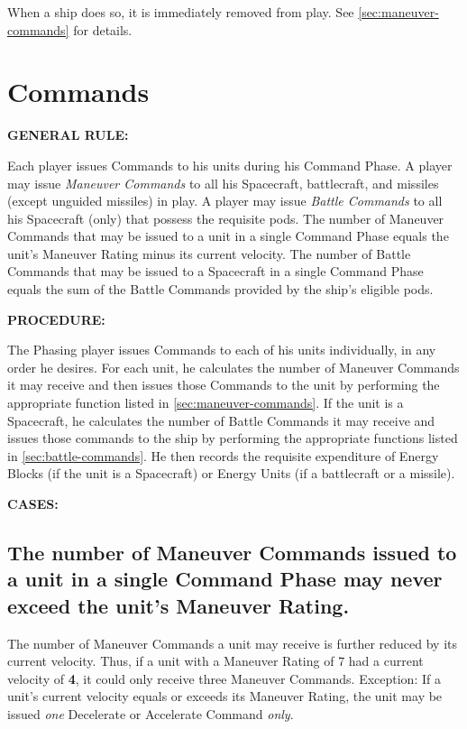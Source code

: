 When a ship does so, it is immediately removed from play. See
\ref{sec:maneuver-commands} for details.

\section{Commands}
\label{sec:commands}

\noindent\textbf{GENERAL RULE:}

Each player issues Commands to his units during his Command Phase. A
player may issue \emph{Maneuver Commands} to all his Spacecraft,
battlecraft, and missiles (except unguided missiles) in play. A player
may issue \emph{Battle Commands} to all his Spacecraft (only) that
possess the requisite pods. The number of Maneuver Commands that may
be issued to a unit in a single Command Phase equals the unit's
Maneuver Rating minus its current velocity. The number of Battle
Commands that may be issued to a Spacecraft in a single Command Phase
equals the sum of the Battle Commands provided by the ship's eligible
pods.

\medskip

\noindent\textbf{PROCEDURE:}

The Phasing player issues Commands to each of his units individually,
in any order he desires. For each unit, he calculates the number of
Maneuver Commands it may receive and then issues those Commands to the
unit by performing the appropriate function listed in
\ref{sec:maneuver-commands}. If the unit is a Spacecraft, he
calculates the number of Battle Commands it may receive and issues
those commands to the ship by performing the appropriate functions
listed in \ref{sec:battle-commands}. He then records the requisite
expenditure of Energy Blocks (if the unit is a Spacecraft) or Energy
Units (if a battlecraft or a missile).

\medskip

\noindent\textbf{CASES:}


\subsection[Number Of Maneuver Commands]{The number of Maneuver
  Commands issued to a unit in a single Command Phase may never exceed
  the  
  unit's Maneuver Rating.}
\label{sec:number-maneuver-commands}



The number of Maneuver Commands a unit may receive is further reduced
by its current velocity. Thus, if a unit with a Maneuver Rating of 7
had a current velocity of \textbf{4}, it could only receive three
Maneuver Commands. Exception: If a unit's current velocity equals or
exceeds its Maneuver Rating, the unit may be issued \emph{one}
Decelerate or Accelerate Command \emph{only}.

